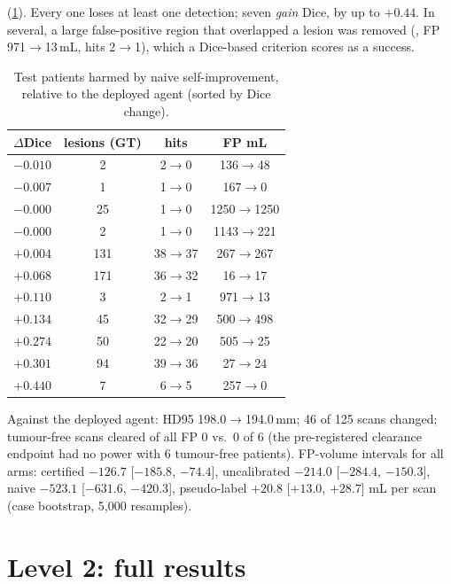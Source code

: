  (\cref{tab:supp_naiveharm}). Every one loses at least one detection; seven \emph{gain} Dice, by up to $+0.44$. In several, a large false-positive region that overlapped a lesion was removed (\eg, FP 971$\to$13\,mL, hits 2$\to$1), which a Dice-based criterion scores as a success.

\begin{table}[h]
\centering
\caption{Test patients harmed by naive self-improvement, relative to the deployed agent (sorted by Dice change).}
\label{tab:supp_naiveharm}
\footnotesize
\setlength{\tabcolsep}{4pt}
\begin{tabular}{@{}rccc@{}}
\toprule
$\Delta$Dice & lesions (GT) & hits & FP mL \\
\midrule
$-0.010$ & 2 & 2$\to$0 & 136$\to$48 \\
$-0.007$ & 1 & 1$\to$0 & 167$\to$0 \\
$-0.000$ & 25 & 1$\to$0 & 1250$\to$1250 \\
$-0.000$ & 2 & 1$\to$0 & 1143$\to$221 \\
$+0.004$ & 131 & 38$\to$37 & 267$\to$267 \\
$+0.068$ & 171 & 36$\to$32 & 16$\to$17 \\
$+0.110$ & 3 & 2$\to$1 & 971$\to$13 \\
$+0.134$ & 45 & 32$\to$29 & 500$\to$498 \\
$+0.274$ & 50 & 22$\to$20 & 505$\to$25 \\
$+0.301$ & 94 & 39$\to$36 & 27$\to$24 \\
$+0.440$ & 7 & 6$\to$5 & 257$\to$0 \\
\bottomrule
\end{tabular}
\end{table}

 Against the deployed agent: HD95 198.0$\to$194.0\,mm; 46 of 125 scans changed; tumour-free scans cleared of all FP 0 vs.\ 0 of 6 (the pre-registered clearance endpoint had no power with 6 tumour-free patients). FP-volume intervals for all arms: certified $-126.7$ [$-185.8$, $-74.4$], uncalibrated $-214.0$ [$-284.4$, $-150.3$], naive $-523.1$ [$-631.6$, $-420.3$], pseudo-label $+20.8$ [$+13.0$, $+28.7$] mL per scan (case bootstrap, 5,000 resamples).

\section{Level 2: full results}
\label{sec:supp_level2}

